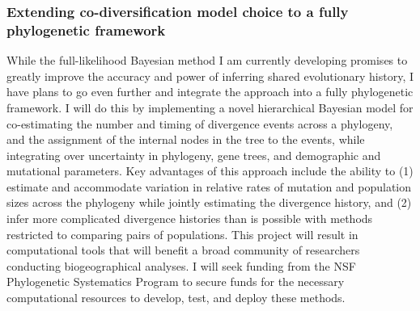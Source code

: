 \subsubsection*{Extending co-diversification model choice to a fully
    phylogenetic framework}
While the full-likelihood Bayesian method I am currently developing promises to
greatly improve the accuracy and power of inferring shared evolutionary
history, I have plans to go even further and integrate the approach into a
fully phylogenetic framework.
I will do this by implementing a novel hierarchical Bayesian model for
co-estimating the number and timing of divergence events across a phylogeny,
and the assignment of the internal nodes in the tree to the events, while
integrating over uncertainty in phylogeny, gene trees, and demographic and
mutational parameters.
Key advantages of this approach include the ability to
(1) estimate and accommodate variation in relative rates of mutation and
population sizes across the phylogeny while jointly estimating the divergence
history, and
(2) infer more complicated divergence histories than is possible with methods
restricted to comparing pairs of populations.
This project will result in computational tools that will benefit a broad
community of researchers conducting biogeographical analyses. I will seek
funding from the NSF Phylogenetic Systematics Program to secure funds for the
necessary computational resources to develop, test, and deploy these methods.


